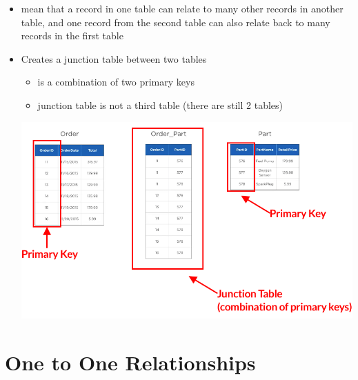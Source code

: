 \documentclass[12pt]{article}
\begin{document}
\begin{itemize}
    \item mean that a record in one table can relate to many other records in
    another table, and one record from the second table can also relate back
    to many records in the first table
    \item Creates a junction table between two tables
    \begin{itemize}
        \item is a combination of two primary keys
        \item junction table is not a third table (there are still 2 tables)
    \end{itemize}

    \begin{center}
    \includegraphics[width=0.8\linewidth]{images/part_3_notes_2.png}
    \end{center}
\end{itemize}

\bigskip

\section{One to One Relationships}

\bigskip
\end{document}
